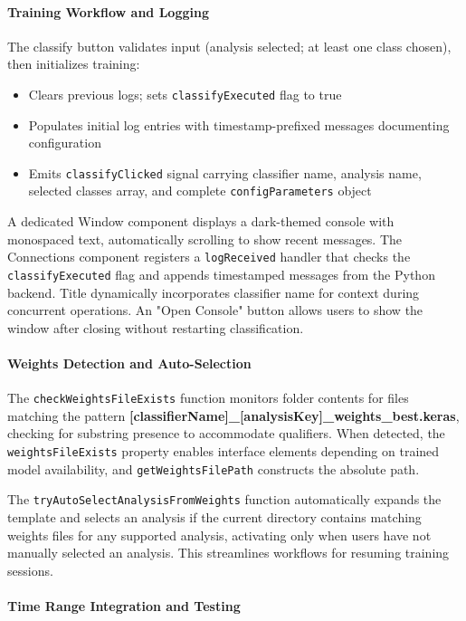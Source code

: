 \documentclass[12pt]{report}
\begin{document}
\paragraph{Training Workflow and Logging}\mbox{}

The classify button validates input (analysis selected; at least one class chosen), then initializes training:

\begin{itemize}
\item Clears previous logs; sets \verb|classifyExecuted| flag to true
\item Populates initial log entries with timestamp-prefixed messages documenting configuration
\item Emits \verb|classifyClicked| signal carrying classifier name, analysis name, selected classes array, and complete \verb|configParameters| object
\end{itemize}

A dedicated Window component displays a dark-themed console with monospaced text, automatically scrolling to show recent messages. The Connections component registers a \verb|logReceived| handler that checks the \verb|classifyExecuted| flag and appends timestamped messages from the Python backend. Title dynamically incorporates classifier name for context during concurrent operations. An "Open Console" button allows users to show the window after closing without restarting classification.

\paragraph{Weights Detection and Auto-Selection}\mbox{}

The \verb|checkWeightsFileExists| function monitors folder contents for files matching the pattern \textbf{[classifierName]\_[analysisKey]\_weights\_best.keras}, checking for substring presence to accommodate qualifiers. When detected, the \verb|weightsFileExists| property enables interface elements depending on trained model availability, and \verb|getWeightsFilePath| constructs the absolute path.

The \verb|tryAutoSelectAnalysisFromWeights| function automatically expands the template and selects an analysis if the current directory contains matching weights files for any supported analysis, activating only when users have not manually selected an analysis. This streamlines workflows for resuming training sessions.

\paragraph{Time Range Integration and Testing}\mbox{}
\end{document}
